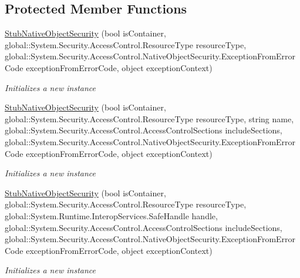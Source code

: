 \subsection*{Protected Member Functions}
\begin{DoxyCompactItemize}
\item 
\hyperlink{class_system_1_1_security_1_1_access_control_1_1_fakes_1_1_stub_native_object_security_a0a2b3c2a0ace3d8bb85367763f69cbe1}{Stub\-Native\-Object\-Security} (bool is\-Container, global\-::\-System.\-Security.\-Access\-Control.\-Resource\-Type resource\-Type, global\-::\-System.\-Security.\-Access\-Control.\-Native\-Object\-Security.\-Exception\-From\-Error\-Code exception\-From\-Error\-Code, object exception\-Context)
\begin{DoxyCompactList}\small\item\em Initializes a new instance\end{DoxyCompactList}\item 
\hyperlink{class_system_1_1_security_1_1_access_control_1_1_fakes_1_1_stub_native_object_security_a50f1566640306e8ee7775110d5431b2c}{Stub\-Native\-Object\-Security} (bool is\-Container, global\-::\-System.\-Security.\-Access\-Control.\-Resource\-Type resource\-Type, string name, global\-::\-System.\-Security.\-Access\-Control.\-Access\-Control\-Sections include\-Sections, global\-::\-System.\-Security.\-Access\-Control.\-Native\-Object\-Security.\-Exception\-From\-Error\-Code exception\-From\-Error\-Code, object exception\-Context)
\begin{DoxyCompactList}\small\item\em Initializes a new instance\end{DoxyCompactList}\item 
\hyperlink{class_system_1_1_security_1_1_access_control_1_1_fakes_1_1_stub_native_object_security_a6f532f04aea585b54ce265f81e3645e1}{Stub\-Native\-Object\-Security} (bool is\-Container, global\-::\-System.\-Security.\-Access\-Control.\-Resource\-Type resource\-Type, global\-::\-System.\-Runtime.\-Interop\-Services.\-Safe\-Handle handle, global\-::\-System.\-Security.\-Access\-Control.\-Access\-Control\-Sections include\-Sections, global\-::\-System.\-Security.\-Access\-Control.\-Native\-Object\-Security.\-Exception\-From\-Error\-Code exception\-From\-Error\-Code, object exception\-Context)
\begin{DoxyCompactList}\small\item\em Initializes a new instance\end{DoxyCompactList}\item 

\end{DoxyCompactItemize}
